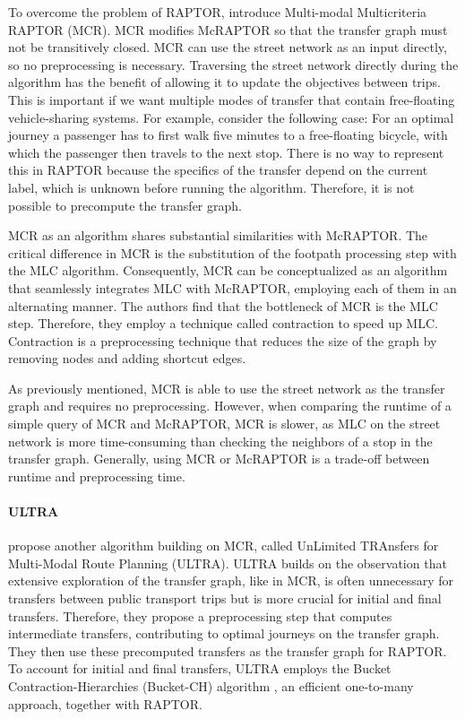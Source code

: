 To overcome the problem of RAPTOR,  introduce Multi-modal Multicriteria RAPTOR (MCR).
MCR modifies McRAPTOR so that the transfer graph must not be transitively closed.
MCR can use the street network as an input directly, so no preprocessing is necessary.
Traversing the street network directly during the algorithm has the benefit of allowing it to update the objectives between trips.
This is important if we want multiple modes of transfer that contain free-floating vehicle-sharing systems.
For example, consider the following case:
For an optimal journey a passenger has to first walk five minutes to a free-floating bicycle, with which the passenger then travels to the next stop.
There is no way to represent this in RAPTOR because the specifics of the transfer depend on the current label, which is unknown before running the algorithm.
Therefore, it is not possible to precompute the transfer graph.

MCR as an algorithm shares substantial similarities with McRAPTOR.
The critical difference in MCR is the substitution of the footpath processing step with the MLC algorithm.
Consequently, MCR can be conceptualized as an algorithm that seamlessly integrates MLC with McRAPTOR, employing each of them in an alternating manner.
The authors find that the bottleneck of MCR is the MLC step.
Therefore, they employ a technique called contraction  to speed up MLC.
Contraction is a preprocessing technique that reduces the size of the graph by removing nodes and adding shortcut edges.

As previously mentioned, MCR is able to use the street network as the transfer graph and requires no preprocessing.
However, when comparing the runtime of a simple query of MCR and McRAPTOR, MCR is slower, as MLC on the street network is more time-consuming than checking the neighbors of a stop in the transfer graph.
Generally, using MCR or McRAPTOR is a trade-off between runtime and preprocessing time.


\paragraph{ULTRA}
\label{subsubsec:ultra}

 propose another algorithm building on MCR, called UnLimited TRAnsfers for Multi-Modal Route Planning (ULTRA).
ULTRA builds on the observation that extensive exploration of the transfer graph, like in MCR, is often unnecessary for transfers between public transport trips but is more crucial for initial and final transfers.
Therefore, they propose a preprocessing step that computes intermediate transfers, contributing to optimal journeys on the transfer graph.
They then use these precomputed transfers as the transfer graph for RAPTOR.
To account for initial and final transfers, ULTRA employs the Bucket Contraction-Hierarchies (Bucket-CH) algorithm , an efficient one-to-many approach, together with RAPTOR.

